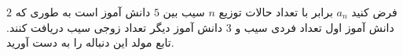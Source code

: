 \EXERCISE
فرض کنید 
$a_n$
برابر با تعداد حالات توزیع 
$n$
 سیب بین 
$5$
  دانش آموز است به طوری که 
$2$
   دانش آموز اول تعداد فردی سیب و 
$3$
    دانش آموز دیگر تعداد زوجی سیب دریافت کنند. تابع مولد این دنباله را به دست آورید.